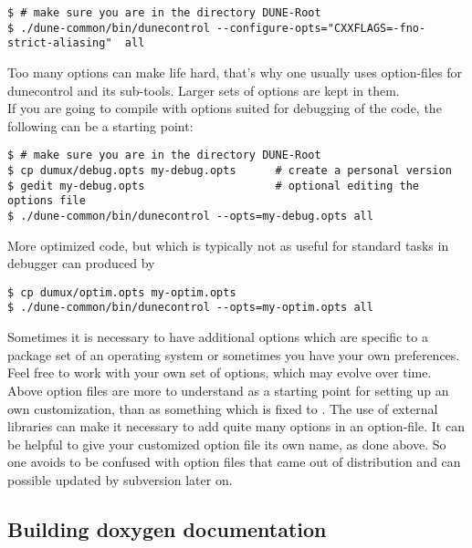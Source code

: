 \begin{lstlisting}[style=Bash]
$ # make sure you are in the directory DUNE-Root
$ ./dune-common/bin/dunecontrol --configure-opts="CXXFLAGS=-fno-strict-aliasing"  all
\end{lstlisting}

Too many options can make life hard, that's why one usually uses option-files for dunecontrol and its sub-tools.
Larger sets of options are kept in them. \\

If you are going to compile with options suited for debugging of the code, the following
can be a starting point:


\begin{lstlisting}[style=Bash]
$ # make sure you are in the directory DUNE-Root
$ cp dumux/debug.opts my-debug.opts      # create a personal version
$ gedit my-debug.opts                    # optional editing the options file 
$ ./dune-common/bin/dunecontrol --opts=my-debug.opts all 
\end{lstlisting}

More optimized code, but which is typically not as useful for standard tasks in debugger can produced by 

\begin{lstlisting}[style=Bash]
$ cp dumux/optim.opts my-optim.opts 
$ ./dune-common/bin/dunecontrol --opts=my-optim.opts all
\end{lstlisting}

Sometimes it is necessary to have additional options which
are specific to a package set of an operating system or
sometimes you have your own preferences.
Feel free to work with your own set of options, which may evolve over time.
Above option files are more to understand as a starting point
for setting up an own customization, than as something which is fixed to \Dumux.
The use of external libraries can make it necessary to add quite many options in an option-file.
It can be helpful to give your customized option file its own name, as done above.
So one avoids to be confused with option files that came out of distribution
and can possible updated by subversion later on.

\subsection{Building doxygen documentation} \label{sec:build-doxy-doc}

